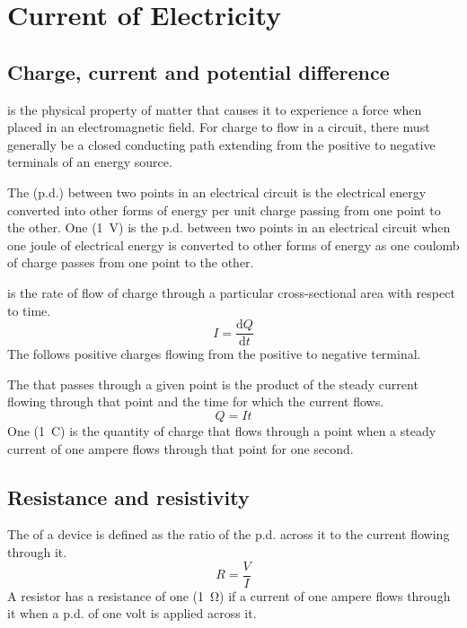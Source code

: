 \documentclass[Physics.tex]{subfiles}
\begin{document}
\chapter{Current of Electricity}
\section{Charge, current and potential difference}
 is the physical property of matter that causes it to experience a force when placed in an electromagnetic field. For charge to flow in a circuit, there must generally be a closed conducting path extending from the positive to negative terminals of an energy source.

The  (p.d.) between two points in an electrical circuit is the electrical energy converted into other forms of energy per unit charge passing from one point to the other. One  (\SI{1}{\volt}) is the p.d. between two points in an electrical circuit when one joule of electrical energy is converted to other forms of energy as one coulomb of charge passes from one point to the other.

 is the rate of flow of charge through a particular cross-sectional area with respect to time. \begin{equation}I = \frac{\mathrm{d}Q}{\mathrm{d}t}\end{equation} The  follows positive charges flowing from the positive to negative terminal.

The  that passes through a given point is the product of the steady current flowing through that point and the time for which the current flows. \begin{equation}Q = It\end{equation} One  (\SI{1}{\coulomb}) is the quantity of charge that flows through a point when a steady current of one ampere flows through that point for one second.
\section{Resistance and resistivity}
The  of a device is defined as the ratio of the p.d. across it to the current flowing through it. \begin{equation}R = \frac{V}{I}\end{equation} A resistor has a resistance of one  (\SI{1}{\ohm}) if a current of one ampere flows through it when a p.d. of one volt is applied across it.
\end{document}
